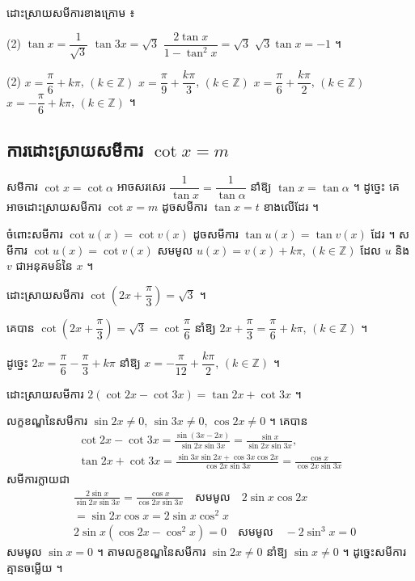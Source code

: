 \begin{pro}
ដោះស្រាយសមីការខាងក្រោម ៖
\begin{tasks}(2)
  \task $\tan x = \dfrac{1}{\sqrt{3}}$
  \task $\tan 3x = \sqrt{3}$
  \task $\dfrac{2\tan x}{1 - \tan^2 x} = \sqrt{3}$
  \task $\sqrt{3}\tan x = -1$ ។
\end{tasks}
\ans
\begin{tasks}(2)
  \task $x = \dfrac{\pi}{6} + k\pi$, $(k \in \mathbb{Z})$
  \task $x = \dfrac{\pi}{9} + \dfrac{k\pi}{3}$, $(k \in \mathbb{Z})$
  \task $x = \dfrac{\pi}{6} + \dfrac{k\pi}{2}$, $(k \in \mathbb{Z})$
  \task $x = -\dfrac{\pi}{6} + k\pi$, $(k \in \mathbb{Z})$ ។
\end{tasks}
\end{pro}

\subsection{ការដោះស្រាយសមីការ \texorpdfstring{$\cot x = m$}{cot x = m}}

សមីការ $\cot x = \cot\alpha$ អាចសរសេរ $\dfrac{1}{\tan x} = \dfrac{1}{\tan\alpha}$ នាំឱ្យ $\tan x = \tan\alpha$ ។ ដូច្នេះ គេអាចដោះស្រាយសមីការ $\cot x = m$ ដូចសមីការ $\tan x = t$ ខាងលើដែរ ។

ចំពោះសមីការ $\cot u(x) = \cot v(x)$ ដូចសមីការ $\tan u(x) = \tan v(x)$ ដែរ ។ សមីការ $\cot u(x) = \cot v(x)$ សមមូល $u(x) = v(x) + k\pi$, $(k \in \mathbb{Z})$ ដែល $u$ និង $v$ ជាអនុគមន៍នៃ $x$ ។

\begin{example}[ឧទាហរណ៍]
ដោះស្រាយសមីការ $\cot\left(2x + \dfrac{\pi}{3}\right) = \sqrt{3}$ ។

គេបាន $\cot\left(2x + \dfrac{\pi}{3}\right) = \sqrt{3} = \cot\dfrac{\pi}{6}$ នាំឱ្យ $2x + \dfrac{\pi}{3} = \dfrac{\pi}{6} + k\pi$, $(k \in \mathbb{Z})$ ។

ដូច្នេះ $2x = \dfrac{\pi}{6} - \dfrac{\pi}{3} + k\pi$ នាំឱ្យ $x = -\dfrac{\pi}{12} + \dfrac{k\pi}{2}$, $(k \in \mathbb{Z})$ ។
\end{example}

\begin{example}[លំហាត់គំរូ ៧]
ដោះស្រាយសមីការ $2(\cot 2x - \cot 3x) = \tan 2x + \cot 3x$ ។
\end{example}
\ans
លក្ខខណ្ឌនៃសមីការ $\sin 2x \ne 0$, $\sin 3x \ne 0$, $\cos 2x \ne 0$ ។ គេបាន
\[
\begin{gathered}
\cot 2x - \cot 3x = \frac{\sin(3x - 2x)}{\sin 2x\sin 3x} = \frac{\sin x}{\sin 2x\sin 3x},\\
\tan 2x + \cot 3x = \frac{\sin 3x\sin 2x + \cos 3x\cos 2x}{\cos 2x\sin 3x} = \frac{\cos x}{\cos 2x\sin 3x}
\end{gathered}
\]
សមីការក្លាយជា
\[
\begin{aligned}
&\frac{2\sin x}{\sin 2x\sin 3x} = \frac{\cos x}{\cos 2x\sin 3x} \quad \text{សមមូល} \quad 2\sin x\cos 2x\\
&= \sin 2x\cos x = 2\sin x\cos^2 x\\
&2\sin x(\cos 2x - \cos^2 x) = 0 \quad \text{សមមូល} \quad -2\sin^3 x = 0
\end{aligned}
\]
សមមូល $\sin x = 0$ ។ តាមលក្ខខណ្ឌនៃសមីការ $\sin 2x \ne 0$ នាំឱ្យ $\sin x \ne 0$ ។ ដូច្នេះសមីការគ្មានចម្លើយ ។

